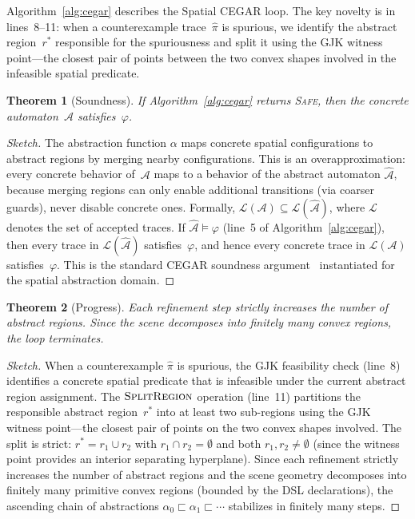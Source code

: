 \documentclass[11pt,a4paper]{article}
\newtheorem{theorem}{Theorem}
\begin{document}
Algorithm~\ref{alg:cegar} describes the Spatial CEGAR loop.
The key novelty is in lines~8--11: when a counterexample trace~$\hat{\pi}$ is
spurious, we identify the abstract region~$r^*$ responsible for the spuriousness
and split it using the GJK witness point---the closest pair of points between
the two convex shapes involved in the infeasible spatial predicate.

\begin{theorem}[Soundness]\label{thm:cegar-sound}
If Algorithm~\ref{alg:cegar} returns \textsc{Safe}, then the concrete
automaton~$\mathcal{A}$ satisfies~$\varphi$.
\end{theorem}

\begin{proof}[Sketch]
The abstraction function $\alpha$ maps concrete spatial configurations to
abstract regions by merging nearby configurations.
This is an overapproximation: every concrete behavior of~$\mathcal{A}$ maps to
a behavior of the abstract automaton $\hat{\mathcal{A}}$, because merging
regions can only enable additional transitions (via coarser guards), never
disable concrete ones.
Formally, $\mathcal{L}(\mathcal{A}) \subseteq \mathcal{L}(\hat{\mathcal{A}})$,
where $\mathcal{L}$ denotes the set of accepted traces.
If $\hat{\mathcal{A}} \models \varphi$ (line~5 of Algorithm~\ref{alg:cegar}),
then every trace in $\mathcal{L}(\hat{\mathcal{A}})$ satisfies~$\varphi$, and
hence every concrete trace in $\mathcal{L}(\mathcal{A})$ satisfies~$\varphi$.
This is the standard CEGAR soundness argument~\cite{clarke2000,clarke2003}
instantiated for the spatial abstraction domain.
\end{proof}

\begin{theorem}[Progress]\label{thm:cegar-progress}
Each refinement step strictly increases the number of abstract regions.
Since the scene decomposes into finitely many convex regions, the loop terminates.
\end{theorem}

\begin{proof}[Sketch]
When a counterexample $\hat{\pi}$ is spurious, the GJK feasibility check
(line~8) identifies a concrete spatial predicate that is infeasible under the
current abstract region assignment.
The $\textsc{SplitRegion}$ operation (line~11) partitions the responsible
abstract region~$r^*$ into at least two sub-regions using the GJK witness
point---the closest pair of points on the two convex shapes involved.
The split is strict: $r^* = r_1 \cup r_2$ with $r_1 \cap r_2 = \emptyset$
and both $r_1, r_2 \neq \emptyset$ (since the witness point provides an
interior separating hyperplane).
Since each refinement strictly increases the number of abstract regions and
the scene geometry decomposes into finitely many primitive convex regions
(bounded by the DSL declarations), the ascending chain of abstractions
$\alpha_0 \sqsubset \alpha_1 \sqsubset \cdots$ stabilizes in finitely
many steps.
\end{proof}
\end{document}
